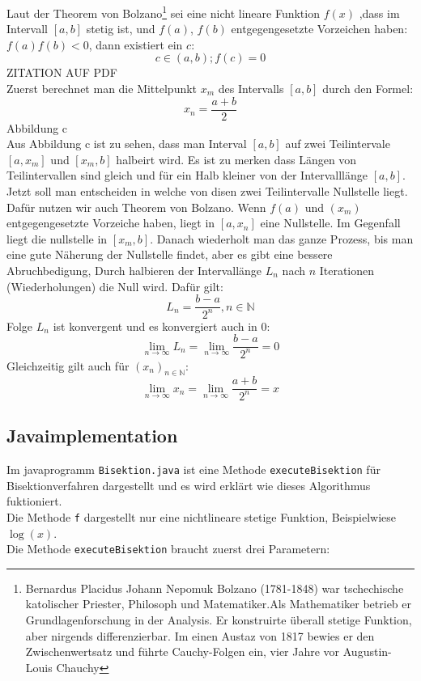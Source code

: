 Laut der Theorem von Bolzano\footnote{Bernardus Placidus Johann Nepomuk Bolzano (1781-1848) war tschechische katolischer Priester, Philosoph und Matematiker.Als Mathematiker betrieb er Grundlagenforschung in der Analysis. Er konstruirte überall stetige Funktion, aber nirgends differenzierbar.
Im einen Austaz von 1817 bewies er den Zwischenwertsatz und führte Cauchy-Folgen ein, vier Jahre vor Augustin- Louis Chauchy} sei eine nicht lineare  Funktion $f(x)$ ,dass im Intervall $[a,b]$ stetig ist,  
und  $f(a)$, $f(b)$ entgegengesetzte Vorzeichen haben: $f(a)f(b)<0$, dann existiert ein $c$:
\begin{equation}
c \in (a,b) ; f(c)=0
\end{equation}  ZITATION AUF PDF\\
Zuerst berechnet man die Mittelpunkt $x_m$ des Intervalls $[a,b]$ durch den Formel:
\begin{equation} 
x_n = \frac{a+b}{2}
\end{equation}
Abbildung c
\\
Aus Abbildung c ist zu sehen, dass man Interval $[a,b]$ auf zwei Teilintervale $[a,x_m]$ und $[x_m,b]$ halbeirt wird. Es ist zu merken dass Längen von Teilintervallen sind gleich und für ein Halb kleiner von der Intervalllänge $[a,b]$. 
Jetzt soll man entscheiden in welche von disen zwei Teilintervalle Nullstelle liegt. Dafür nutzen wir auch Theorem von Bolzano. 
Wenn $f(a)$ und $(x_m)$ entgegengesetzte Vorzeiche haben, liegt in $[a,x_n]$ eine Nullstelle. Im Gegenfall liegt die nullstelle in $[x_m,b]$.
Danach wiederholt man das ganze  Prozess, bis man eine gute Näherung der Nullstelle findet, aber es gibt eine bessere Abruchbedigung, Durch halbieren der Intervallänge $L_n$ nach $n$ Iterationen (Wiederholungen) die Null wird. Dafür gilt:
\begin{equation}
L_n = \frac{b-a}{2^n}, n \in \mathbb{N}
\end{equation} Folge $L_n$ ist konvergent und es konvergiert auch in 0:
\begin{equation}\lim_{n \to \infty}L_n = \lim_{n \to \infty}\frac{b-a}{2^n}=0
\end{equation}
Gleichzeitig gilt auch für $(x_n)_{n \in \mathbb{N}}$:
\begin{equation}
\lim_{n \to \infty} x_n =\lim_{n \to \infty}\frac{a+b}{2^n} =x
\end{equation}
\subsection{Javaimplementation}
Im javaprogramm \verb|Bisektion.java| ist eine Methode \verb|executeBisektion| für Bisektionverfahren dargestellt und es wird erklärt wie dieses Algorithmus fuktioniert.\\
Die Methode \verb|f| dargestellt nur eine nichtlineare stetige Funktion, Beispielwiese $\log(x)$.
\\
Die Methode \verb|executeBisektion| braucht zuerst drei Parametern:

